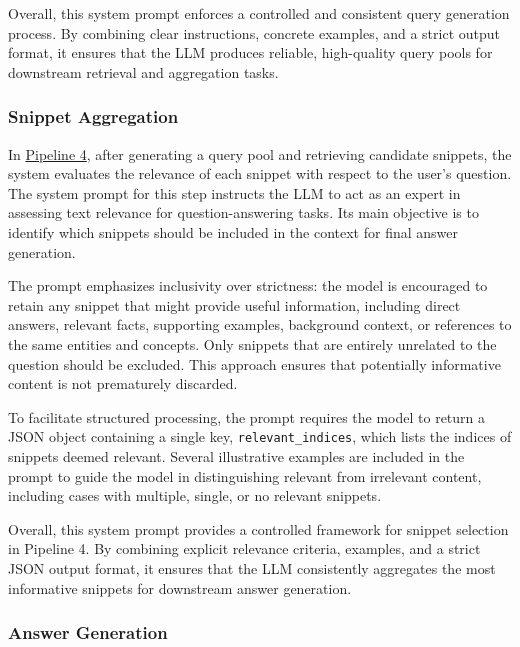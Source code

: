 \documentclass[manuscript,screen]{acmart}
\begin{document}
\begin{CCSXML}
		Overall, this system prompt enforces a controlled and consistent query generation process. By combining clear instructions, concrete examples, and a strict output format, it ensures that the LLM produces reliable, high-quality query pools for downstream retrieval and aggregation tasks.
	
		\subsubsection{Snippet Aggregation}
		\label{subsubsec:snippet-aggregation}
		
		In \hyperref[fig:pipeline4]{Pipeline 4}, after generating a query pool and retrieving candidate snippets, the system evaluates the relevance of each snippet with respect to the user's question. The system prompt for this step instructs the LLM to act as an expert in assessing text relevance for question-answering tasks. Its main objective is to identify which snippets should be included in the context for final answer generation.
		
		The prompt emphasizes inclusivity over strictness: the model is encouraged to retain any snippet that might provide useful information, including direct answers, relevant facts, supporting examples, background context, or references to the same entities and concepts. Only snippets that are entirely unrelated to the question should be excluded. This approach ensures that potentially informative content is not prematurely discarded.
		
		To facilitate structured processing, the prompt requires the model to return a JSON object containing a single key, \texttt{relevant\_indices}, which lists the indices of snippets deemed relevant. Several illustrative examples are included in the prompt to guide the model in distinguishing relevant from irrelevant content, including cases with multiple, single, or no relevant snippets.
		
		Overall, this system prompt provides a controlled framework for snippet selection in Pipeline 4. By combining explicit relevance criteria, examples, and a strict JSON output format, it ensures that the LLM consistently aggregates the most informative snippets for downstream answer generation.
		
		\subsubsection{Answer Generation}
		\label{subsubsec:answer-generation}
		

\end{CCSXML}
\end{document}
